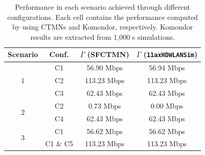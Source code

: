 \documentclass{article}
\begin{document}
\begin{table}[t!]
	\centering
	\begin{tabular}{|c|c|c|c|}
		\hline
		\textbf{Scenario} & \textbf{Conf.} & \textbf{$\overline{\Gamma}$ (SFCTMN)} & \textbf{$\overline{\Gamma}$ (\texttt{11axHDWLANSim})} \\ \hline
		\multirow{3}{*}{1} & C1 & 56.90 Mbps &  56.94 Mbps\\ \cline{2-4} 
		& C2 & 113.23 Mbps & 113.23 Mbps\\ \cline{2-4} 
		& C3 & 62.43 Mbps & 62.43 Mbps\\ \hline
		\multirow{2}{*}{2} & C2 & 0.73 Mbps & 0.00 Mbps\\ \cline{2-4} 
		& C4 & 62.43 Mbps & 62.43 Mbps \\ \hline
		\multirow{2}{*}{3} & C1 & 56.62 Mbps & 56.62 Mbps\\ \cline{2-4} 
		& C1 \& C5 & 113.23 Mbps & 113.23 Mbps \\ \hline
	\end{tabular}
	\caption{Performance in each scenario achieved through different configurations. Each cell contains the performance computed by using CTMNs and Komondor, respectively. Komondor results are extracted from 1,000 s simulations.}
	\label{tbl:results_sr_improvements}
\end{table}
\end{document}
